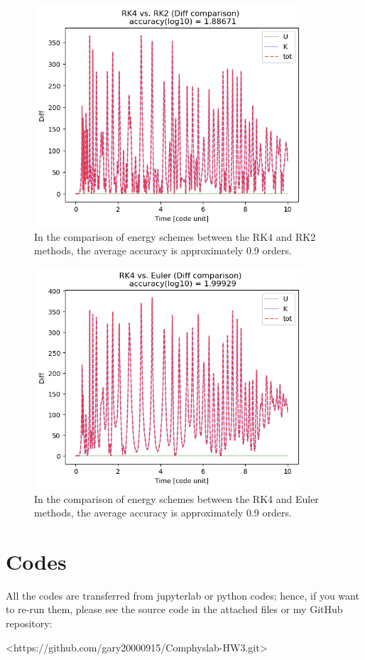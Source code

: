 \documentclass[12pt]{article}
\begin{document}
    \begin{figure}[H]
        \centering 
        \includegraphics[width = 10cm]{./Compare/RK2.png}
        \caption{In the comparison of energy schemes between the RK4 and RK2 methods, the average accuracy is approximately 0.9 orders.}
        \label{RK4_RK2}
    \end{figure}

    \begin{figure}[H]
        \centering 
        \includegraphics[width = 10cm]{./Compare/Euler.png}
        \caption{In the comparison of energy schemes between the RK4 and Euler methods, the average accuracy is approximately 0.9 orders.}
        \label{RK4_Euler}
    \end{figure}


\section{Codes}
    All the codes are transferred from jupyterlab or python codes; hence, if you want to re-run them, please see the source code in the attached files or my GitHub repository: \newline
    {\centerline{\ttfamily <https://github.com/gary20000915/Comphyslab-HW3.git>}}
\end{document}
